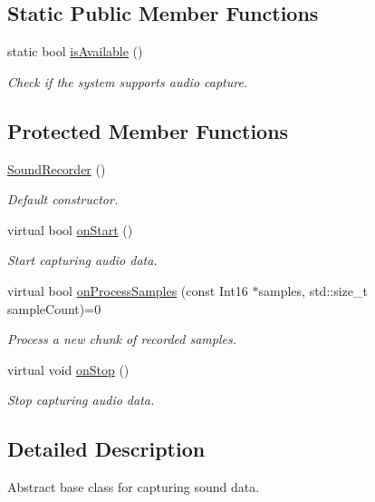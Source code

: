 \subsection*{Static Public Member Functions}
\begin{DoxyCompactItemize}
\item 
static bool \hyperlink{classsf_1_1SoundRecorder_aab2bd0fee9e48d6cfd449b1cb078ce5a}{is\-Available} ()
\begin{DoxyCompactList}\small\item\em Check if the system supports audio capture. \end{DoxyCompactList}\end{DoxyCompactItemize}
\subsection*{Protected Member Functions}
\begin{DoxyCompactItemize}
\item 
\hyperlink{classsf_1_1SoundRecorder_a50ebad413c4f157408a0fa49f23212a9}{Sound\-Recorder} ()
\begin{DoxyCompactList}\small\item\em Default constructor. \end{DoxyCompactList}\item 
virtual bool \hyperlink{classsf_1_1SoundRecorder_a7af418fb036201d3f85745bef78ce77f}{on\-Start} ()
\begin{DoxyCompactList}\small\item\em Start capturing audio data. \end{DoxyCompactList}\item 
virtual bool \hyperlink{classsf_1_1SoundRecorder_a2670124cbe7a87c7e46b4840807f4fd7}{on\-Process\-Samples} (const Int16 $\ast$samples, std\-::size\-\_\-t sample\-Count)=0
\begin{DoxyCompactList}\small\item\em Process a new chunk of recorded samples. \end{DoxyCompactList}\item 
virtual void \hyperlink{classsf_1_1SoundRecorder_aefc36138ca1e96c658301280e4a31b64}{on\-Stop} ()
\begin{DoxyCompactList}\small\item\em Stop capturing audio data. \end{DoxyCompactList}\end{DoxyCompactItemize}


\subsection{Detailed Description}
Abstract base class for capturing sound data. 

